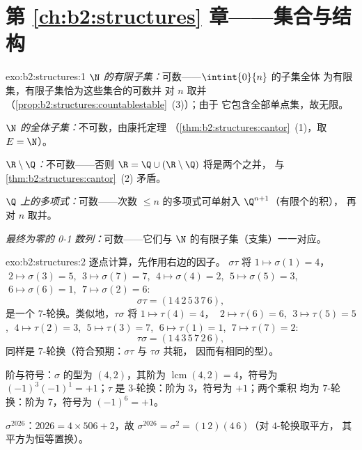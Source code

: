 \section*{第 \ref{ch:b2:structures} 章——集合与结构}

\begin{solution}{exo:b2:structures:1}
\emph{$\N$ 的有限子集：}可数——$\intint{0}{n}$ 的子集全体
为有限集，有限子集恰为这些集合的可数并
对 $n$ 取并
（\cref{prop:b2:structures:countablestable}~(3)）；由于
它包含全部单点集，故无限。

\emph{$\N$ 的全体子集：}不可数，由康托定理
（\cref{thm:b2:structures:cantor}~(1)，取 $E = \N$）。

\emph{$\R \setminus \Q$：}不可数——否则 $\R = \Q \cup
(\R\setminus\Q)$ 将是两个之并，
与 \cref{thm:b2:structures:cantor}~(2) 矛盾。

\emph{$\Q$ 上的多项式：}可数——次数
$\leq n$ 的多项式可单射入 $\Q^{n+1}$（有限个的积），
再对 $n$ 取并。

\emph{最终为零的 0-1 数列：}可数——它们与
$\N$ 的有限子集（支集）一一对应。
\end{solution}

\begin{solution}{exo:b2:structures:2}
逐点计算，先作用右边的因子。
$\sigma\tau$ 将 $1 \mapsto \sigma(1) = 4$，$\;2 \mapsto \sigma(3)
= 5$, $\;3 \mapsto \sigma(7) = 7$, $\;4 \mapsto \sigma(4) = 2$, $\;5
\mapsto \sigma(5) = 3$, $\;6 \mapsto \sigma(6) = 1$, $\;7 \mapsto
\sigma(2) = 6$:
\[
\sigma\tau = (1\,4\,2\,5\,3\,7\,6),
\]
是一个 $7$-轮换。类似地，$\tau\sigma$ 将 $1 \mapsto \tau(4) = 4$，
$\;2 \mapsto \tau(6) = 6$, $\;3 \mapsto \tau(5) = 5$, $\;4 \mapsto
\tau(2) = 3$, $\;5 \mapsto \tau(3) = 7$, $\;6 \mapsto \tau(1) = 1$,
$\;7 \mapsto \tau(7) = 2$:
\[
\tau\sigma = (1\,4\,3\,5\,7\,2\,6),
\]
同样是 $7$-轮换（符合预期：$\sigma\tau$ 与 $\tau\sigma$ 共轭，
因而有相同的型）。

阶与符号：$\sigma$ 的型为 $(4,2)$，其阶为
$\operatorname{lcm}(4,2) = 4$，符号为 $(-1)^3(-1)^1 = +1$；$\tau$
是 $3$-轮换：阶为 $3$，符号为 $+1$；两个乘积
均为 $7$-轮换：阶为 $7$，符号为 $(-1)^6 = +1$。

$\sigma^{2026}$：$2026 = 4 \times 506 + 2$，故 $\sigma^{2026} =
\sigma^2 = (1\,2)(4\,6)$（对 $4$-轮换取平方，
其平方为恒等置换）。
\end{solution}

